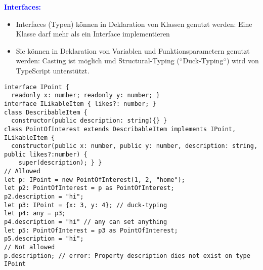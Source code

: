 \textbf{\textcolor{blue}{Interfaces:}}
\begin{itemize}[topsep=0pt, leftmargin=3mm]
    \setlength\itemsep{-0.3em}
    \item Interfaces (Typen) können in Deklaration von Klassen genutzt werden: Eine Klasse darf mehr als ein Interface implementieren
    \item Sie können in Deklaration von Variablen und Funktionsparametern genutzt werden: Casting ist möglich und Structural-Typing (“Duck-Typing“) wird von TypeScript unterstützt.
\end{itemize}
\begin{lstlisting}[style=htmlcssjs]
interface IPoint {
  readonly x: number; readonly y: number; }
interface ILikableItem { likes?: number; }
class DescribableItem {
  constructor(public description: string){} }
class PointOfInterest extends DescribableItem implements IPoint, ILikableItem {
  constructor(public x: number, public y: number, description: string, public likes?:number) {
    super(description); } }
// Allowed
let p: IPoint = new PointOfInterest(1, 2, "home");
let p2: PointOfInterest = p as PointOfInterest;
p2.description = "hi";
let p3: IPoint = {x: 3, y: 4}; // duck-typing
let p4: any = p3;
p4.description = "hi" // any can set anything
let p5: PointOfInterest = p3 as PointOfInterest;
p5.description = "hi";
// Not allowed
p.description; // error: Property description dies not exist on type IPoint
\end{lstlisting}

